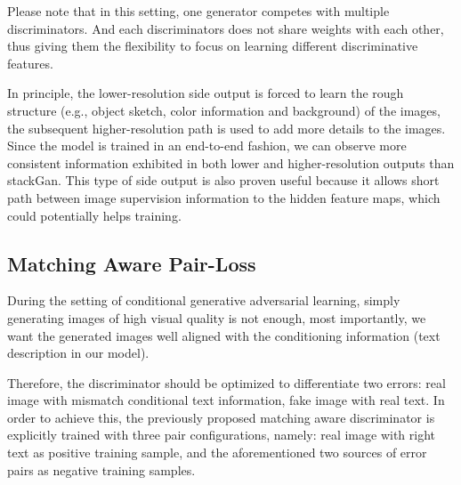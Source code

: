 \documentclass[10pt,twocolumn,letterpaper]{article}
\begin{document}
Please note that in this setting, one generator competes with multiple discriminators. And each discriminators does not share weights with each other, thus giving them the flexibility to focus on learning different discriminative features.
 

In principle, the lower-resolution side output is forced to learn the rough structure (e.g., object sketch, color information and background) of the images, the subsequent higher-resolution path is used to add more details to the images. 
Since the model is trained in an end-to-end fashion, we can observe more consistent information exhibited in both lower and higher-resolution outputs than stackGan\cite{han2017stackgan}. This type of side output is also proven useful because it allows short path between image supervision information to the hidden feature maps, which could potentially helps training.


\subsection{Matching Aware Pair-Loss}
During the setting of conditional generative adversarial learning, simply generating images of high visual quality is not enough, most importantly, we want the generated images well aligned with the conditioning information (text description in our model).     

%

Therefore, the discriminator should be optimized to differentiate two errors: real image with mismatch conditional text information, fake image with real text. In order to achieve this, the previously proposed matching aware discriminator is explicitly trained with three pair configurations, namely: real image with right text as positive training sample, and the aforementioned two sources of error pairs as negative training samples. 
\end{document}
